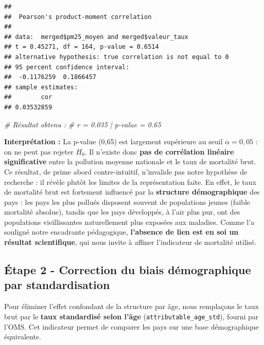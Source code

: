 \documentclass[mstat,12pt]{unswthesis}
\newenvironment{Shaded}{\begin{snugshade}}{\end{snugshade}}
\newcommand{\AttributeTok}[1]{\textcolor[rgb]{0.13,0.29,0.53}{#1}}
\newcommand{\CommentTok}[1]{\textcolor[rgb]{0.56,0.35,0.01}{\textit{#1}}}
\newcommand{\FunctionTok}[1]{\textcolor[rgb]{0.13,0.29,0.53}{\textbf{#1}}}
\newcommand{\NormalTok}[1]{#1}
\newcommand{\OtherTok}[1]{\textcolor[rgb]{0.56,0.35,0.01}{#1}}
\newcommand{\SpecialCharTok}[1]{\textcolor[rgb]{0.81,0.36,0.00}{\textbf{#1}}}
\newcommand{\StringTok}[1]{\textcolor[rgb]{0.31,0.60,0.02}{#1}}
\begin{document}
\begin{verbatim}
## 
##  Pearson's product-moment correlation
## 
## data:  merged$pm25_moyen and merged$valeur_taux
## t = 0.45271, df = 164, p-value = 0.6514
## alternative hypothesis: true correlation is not equal to 0
## 95 percent confidence interval:
##  -0.1176259  0.1866457
## sample estimates:
##        cor 
## 0.03532859
\end{verbatim}

\begin{Shaded}
\begin{Highlighting}[]
\CommentTok{\# Résultat obtenu :}
\CommentTok{\#   r = 0.035  |  p{-}value = 0.65}
\end{Highlighting}
\end{Shaded}

\textbf{Interprétation :} La p-value (0,65) est largement supérieure au
seuil \(\alpha = 0{,}05\) : on ne peut pas rejeter \(H_0\). Il n'existe
donc \textbf{pas de corrélation linéaire significative} entre la
pollution moyenne nationale et le taux de mortalité brut. Ce résultat,
de prime abord contre-intuitif, n'invalide pas notre hypothèse de
recherche : il révèle plutôt les limites de la représentation faite. En
effet, le taux de mortalité brut est fortement influencé par la
\textbf{structure démographique} des pays : les pays les plus pollués
disposent souvent de populations jeunes (faible mortalité absolue),
tandis que les pays développés, à l'air plus pur, ont des populations
vieillissantes naturellement plus exposées aux maladies. Comme l'a
souligné notre encadrante pédagogique, \textbf{l'absence de lien est en
soi un résultat scientifique}, qui nous invite à affiner l'indicateur de
mortalité utilisé.

\subsection{Étape 2 - Correction du biais démographique par
standardisation}\label{uxe9tape-2---correction-du-biais-duxe9mographique-par-standardisation}

Pour éliminer l'effet confondant de la structure par âge, nous
remplaçons le taux brut par le \textbf{taux standardisé selon l'âge}
(\texttt{attributable\_age\_std}), fourni par l'OMS. Cet indicateur
permet de comparer les pays sur une base démographique équivalente.

\begin{Shaded}
\end{Shaded}
\end{document}
